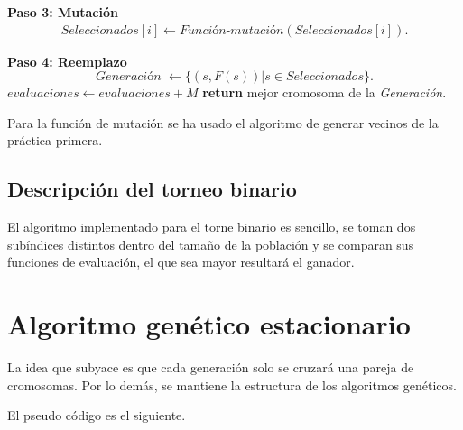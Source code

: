 \begin{algorithm}[H]
\begin{algorithmic}[1]
            \State \textbf{Paso 3:  Mutación}
            \begin{align*}
                Seleccionados[i] \gets \textit{Función-mutación}(Seleccionados[i]).
            \end{align*}
            \EndFor
        
            \State \textbf{Paso 4:  Reemplazo}
            \begin{equation*}
                \textit{Generación } \gets 
                \{
                    (s, F(s)) | s \in  Seleccionados
                \}.
            \end{equation*}
            \State $evaluaciones \gets evaluaciones + M$ 
        \EndWhile
       \State \textbf{return} mejor cromosoma de la \textit{Generación}.
    \end{algorithmic}
  \end{algorithm}

Para la función de mutación se ha usado el algoritmo de generar vecinos de la práctica primera. 

\subsection{Descripción del torneo binario}  

El algoritmo implementado para el torne binario es sencillo, se toman dos 
subíndices distintos dentro del tamaño de la población y se comparan sus 
funciones de evaluación, el que sea mayor resultará el ganador. 

\section{ Algoritmo genético estacionario} 

La idea que subyace es que cada generación solo se cruzará una 
pareja de cromosomas. Por lo demás, se mantiene la estructura de los algoritmos genéticos. 

El pseudo código es el siguiente. 

